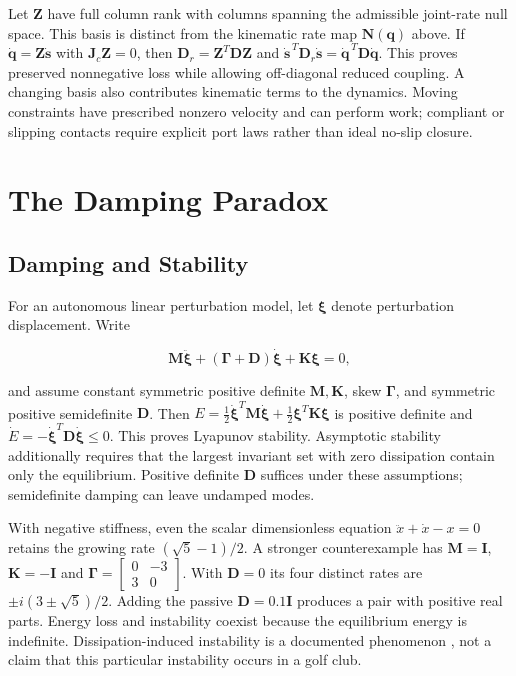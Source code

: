 Let \(\mathbf Z\) have full column rank with columns spanning the admissible joint-rate null space. This basis is distinct from the kinematic rate map \(\bm N(\bm q)\) above. If \(\dot{\mathbf q}=\mathbf Z\dot{\mathbf s}\) with \(\mathbf J_c\mathbf Z=0\), then \(\mathbf D_r=\mathbf Z^T\mathbf D\mathbf Z\) and \(\dot{\mathbf s}^{\,T}\mathbf D_r\dot{\mathbf s}=\dot{\mathbf q}^{\,T}\mathbf D\dot{\mathbf q}\). This proves preserved nonnegative loss while allowing off-diagonal reduced coupling. A changing basis also contributes kinematic terms to the dynamics. Moving constraints have prescribed nonzero velocity and can perform work; compliant or slipping contacts require explicit port laws rather than ideal no-slip closure.

\section{The Damping Paradox}\label{sec:damping_paradox}\label{the-damping-paradox}

\subsection{Damping and Stability}\label{damping-and-stability}

For an autonomous linear perturbation model, let \(\boldsymbol\xi\) denote perturbation displacement. Write

\[
\mathbf M\ddot{\boldsymbol\xi}+(\boldsymbol\Gamma+\mathbf D)\dot{\boldsymbol\xi}+\mathbf K\boldsymbol\xi=0,
\]

and assume constant symmetric positive definite \(\mathbf M,\mathbf K\), skew \(\boldsymbol\Gamma\), and symmetric positive semidefinite \(\mathbf D\). Then \(E=\tfrac12\dot{\boldsymbol\xi}^T\mathbf M\dot{\boldsymbol\xi}+\tfrac12\boldsymbol\xi^T\mathbf K\boldsymbol\xi\) is positive definite and \(\dot E=-\dot{\boldsymbol\xi}^T\mathbf D\dot{\boldsymbol\xi}\leq0\). This proves Lyapunov stability. Asymptotic stability additionally requires that the largest invariant set with zero dissipation contain only the equilibrium. Positive definite \(\mathbf D\) suffices under these assumptions; semidefinite damping can leave undamped modes.

With negative stiffness, even the scalar dimensionless equation
\(\ddot x+\dot x-x=0\) retains the growing rate \((\sqrt5-1)/2\). A
stronger counterexample has \(\mathbf M=\mathbf I\),
\(\mathbf K=-\mathbf I\) and
\(\boldsymbol\Gamma=\begin{bmatrix}0&-3\\3&0\end{bmatrix}\). With
\(\mathbf D=0\) its four distinct rates are \(\pm i(3\pm\sqrt5)/2\).
Adding the passive \(\mathbf D=0.1\mathbf I\) produces a pair with
positive real parts. Energy loss and instability coexist because the
equilibrium energy is indefinite. Dissipation-induced instability is a
documented phenomenon \citep{bloch1994dissipation}, not a claim that
this particular instability occurs in a golf club.

